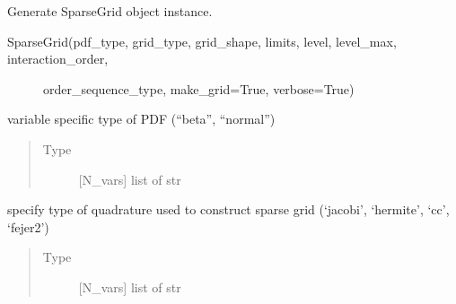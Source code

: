 \documentclass[letterpaper,10pt,english,openany,oneside]{sphinxmanual}
\begin{document}
\begin{fulllineitems}
\label{\detokenize{pygpc:pygpc.grid.SparseGrid}}
Generate SparseGrid object instance.
\begin{description}
\item[{SparseGrid(pdf\_type, grid\_type, grid\_shape, limits, level, level\_max, interaction\_order,}] \leavevmode
order\_sequence\_type, make\_grid=True, verbose=True)

\end{description}

\begin{fulllineitems}
\label{\detokenize{pygpc:pygpc.grid.SparseGrid.pdf_type}}
variable specific type of PDF (“beta”, “normal”)
\begin{quote}\begin{description}
\item[{Type}] \leavevmode
{[}N\_vars{]} list of str

\end{description}\end{quote}

\end{fulllineitems}


\begin{fulllineitems}
\label{\detokenize{pygpc:pygpc.grid.SparseGrid.grid_type}}
specify type of quadrature used to construct sparse grid (‘jacobi’, ‘hermite’, ‘cc’, ‘fejer2’)
\begin{quote}\begin{description}
\item[{Type}] \leavevmode
{[}N\_vars{]} list of str

\end{description}\end{quote}

\end{fulllineitems}



\end{fulllineitems}
\end{document}
